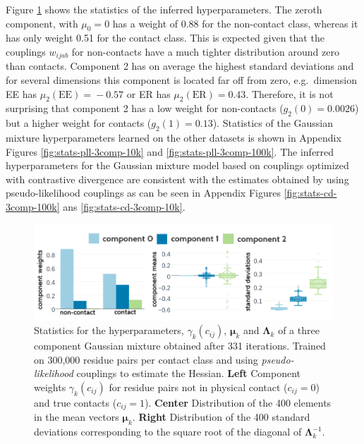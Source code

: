 \documentclass[11pt,a4paper,twoside]{book}
\newcommand{\eq}{\!=\!}
\newcommand{\Lk}{\mathbf{\Lambda}_k}
\newcommand{\muk}{\mathbf{\mu}_k}
\newcommand{\cij}{c_{ij}}
\newcommand{\wijab}{w_{ijab}}
\theoremstyle{definition}
\theoremstyle{definition}
\theoremstyle{remark}
\begin{document}
Figure \ref{fig:stats-pll-3comp-300k} shows the statistics of the
inferred hyperparameters. The zeroth component, with \(\mu_0=0\) has a
weight of 0.88 for the non-contact class, whereas it has only weight
0.51 for the contact class. This is expected given that the couplings
\(\wijab\) for non-contacts have a much tighter distribution around zero
than contacts. Component 2 has on average the highest standard
deviations and for several dimensions this component is located far off
from zero, e.g.~dimension EE has \(\mu_2(\text{EE}) \eq -0.57\) or ER
has \(\mu_2(\text{ER}) \eq 0.43\). Therefore, it is not surprising that
component 2 has a low weight for non-contacts (\(g_2(0) \eq 0.0026\))
but a higher weight for contacts (\(g_2(1) \eq 0.13\)). Statistics of
the Gaussian mixture hyperparameters learned on the other datasets is
shown in Appendix Figures \ref{fig:stats-pll-3comp-10k} and
\ref{fig:stats-pll-3comp-100k}. The inferred hyperparameters for the
Gaussian mixture model based on couplings optimized with contrastive
divergence are consistent with the estimates obtained by using
pseudo-likelihood couplings as can be seen in Appendix Figures
\ref{fig:stats-cd-3comp-100k} ans \ref{fig:stats-cd-3comp-10k}.












\begin{figure}
\includegraphics[width=1\linewidth]{img/bayesian_model/pll/3/stats-pll-3comp-300k} \caption{Statistics for the hyperparameters,
\(\gamma_k(\cij)\), \(\muk\) and \(\Lk\) of a three component Gaussian
mixture obtained after 331 iterations. Trained on 300,000 residue pairs
per contact class and using \emph{pseudo-likelihood} couplings to
estimate the Hessian. \textbf{Left} Component weights \(\gamma_k(\cij)\)
for residue pairs not in physical contact (\(\cij \eq 0\)) and true
contacts (\(\cij \eq 1\)). \textbf{Center} Distribution of the 400
elements in the mean vectors \(\muk\). \textbf{Right} Distribution of
the 400 standard deviations corresponding to the square root of the
diagonal of \(\Lk^{-1}\).}\label{fig:stats-pll-3comp-300k}
\end{figure}
\end{document}
